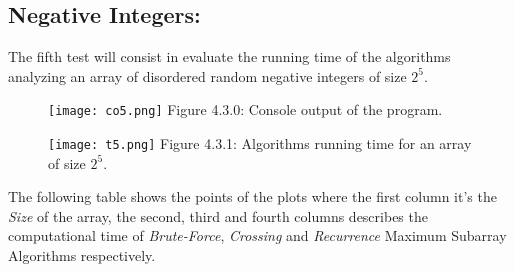 \subsection{Negative Integers:}

The fifth test will consist in evaluate the running time of the algorithms analyzing an array of disordered random negative integers of size $2^{5}$. \hfill \break

\begin{figure}[H]
\texttt{[image: co5.png]}
\centering \linebreak \linebreak Figure 4.3.0: Console output of the program.
\end{figure} \hfill 

\begin{figure}[H]
\texttt{[image: t5.png]}
\centering \linebreak \linebreak Figure 4.3.1: Algorithms running time for an array of size $2^{5}$.
\end{figure} \hfill 

The following table shows the points of the plots where the first column it's the {\itshape Size} of the array, the second, third and fourth columns describes the computational time of {\itshape Brute-Force}, {\itshape Crossing} and {\itshape Recurrence} Maximum Subarray Algorithms respectively. \hfill \break

